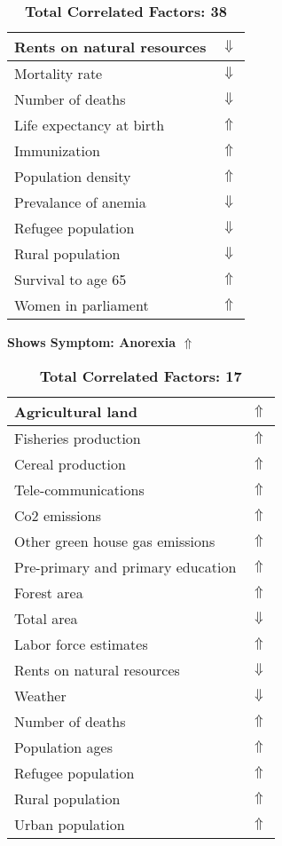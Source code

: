 \documentclass[12pt,notitlepage,oneside]{report}
\begin{document}
\begin{table}[!htb]
\begin{tabular}{|l|l|}
Rents on natural resources & $\Downarrow$\\ \hline
Mortality rate & $\Downarrow$\\ \hline
Number of deaths & $\Downarrow$\\ \hline
Life expectancy at birth & $\Uparrow$\\ \hline
Immunization & $\Uparrow$\\ \hline
Population density & $\Uparrow$\\ \hline
Prevalance of anemia & $\Downarrow$\\ \hline
Refugee population & $\Downarrow$\\ \hline
Rural population & $\Downarrow$\\ \hline
Survival to age 65 & $\Uparrow$\\ \hline
Women in parliament & $\Uparrow$\\ \hline
\end{tabular}
\caption*{\textbf{Total Correlated Factors: 38}}
\end{table}
\clearpage
\begin{table}[!htb]
\caption{\textbf{Shows Symptom: Anorexia $\Uparrow$}}
\centering
\label{Correlated Socio-economic Factors0}
\begin{tabular}{|l|l|}
\hline
Agricultural land & $\Uparrow$\\ \hline
Fisheries production & $\Uparrow$\\ \hline
Cereal production & $\Uparrow$\\ \hline
Tele-communications & $\Uparrow$\\ \hline
Co2 emissions & $\Uparrow$\\ \hline
Other green house gas emissions & $\Uparrow$\\ \hline
Pre-primary and primary education & $\Uparrow$\\ \hline
Forest area & $\Uparrow$\\ \hline
Total area & $\Downarrow$\\ \hline
Labor force estimates & $\Uparrow$\\ \hline
Rents on natural resources & $\Downarrow$\\ \hline
Weather & $\Downarrow$\\ \hline
Number of deaths & $\Uparrow$\\ \hline
Population ages & $\Uparrow$\\ \hline
Refugee population & $\Uparrow$\\ \hline
Rural population & $\Uparrow$\\ \hline
Urban population & $\Uparrow$\\ \hline
\end{tabular}
\caption*{\textbf{Total Correlated Factors: 17}}
\end{table}
\end{document}
